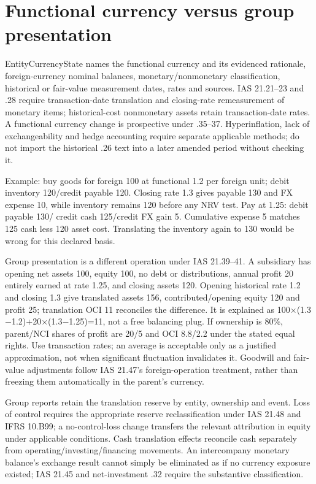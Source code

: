 \hypertarget{functional-currency-versus-group-presentation}{%
\section{Functional currency versus group presentation}\label{method-groups-fx-methods-functional-currency-versus-group-presentation}}

EntityCurrencyState names the functional currency and its evidenced rationale, foreign-currency nominal balances, monetary/nonmonetary classification, historical or fair-value measurement dates, rates and sources. IAS 21.21--23 and .28 require transaction-date translation and closing-rate remeasurement of monetary items; historical-cost nonmonetary assets retain transaction-date rates. A functional currency change is prospective under .35--37. Hyperinflation, lack of exchangeability and hedge accounting require separate applicable methods; do not import the historical .26 text into a later amended period without checking it.

Example: buy goods for foreign 100 at functional 1.2 per foreign unit; debit inventory 120/credit payable 120. Closing rate 1.3 gives payable 130 and FX expense 10, while inventory remains 120 before any NRV test. Pay at 1.25: debit payable 130/ credit cash 125/credit FX gain 5. Cumulative expense 5 matches 125 cash less 120 asset cost. Translating the inventory again to 130 would be wrong for this declared basis.

Group presentation is a different operation under IAS 21.39--41. A subsidiary has opening net assets 100, equity 100, no debt or distributions, annual profit 20 entirely earned at rate 1.25, and closing assets 120. Opening historical rate 1.2 and closing 1.3 give translated assets 156, contributed/opening equity 120 and profit 25; translation OCI 11 reconciles the difference. It is explained as 100\ensuremath{\times}(1.3\ensuremath{-}1.2)+20\ensuremath{\times}(1.3\ensuremath{-}1.25)=11, not a free balancing plug. If ownership is 80\%, parent/NCI shares of profit are 20/5 and OCI 8.8/2.2 under the stated equal rights. Use transaction rates; an average is acceptable only as a justified approximation, not when significant fluctuation invalidates it. Goodwill and fair-value adjustments follow IAS 21.47's foreign-operation treatment, rather than freezing them automatically in the parent's currency.

Group reports retain the translation reserve by entity, ownership and event. Loss of control requires the appropriate reserve reclassification under IAS 21.48 and IFRS 10.B99; a no-control-loss change transfers the relevant attribution in equity under applicable conditions. Cash translation effects reconcile cash separately from operating/investing/financing movements. An intercompany monetary balance's exchange result cannot simply be eliminated as if no currency exposure existed; IAS 21.45 and net-investment .32 require the substantive classification.

